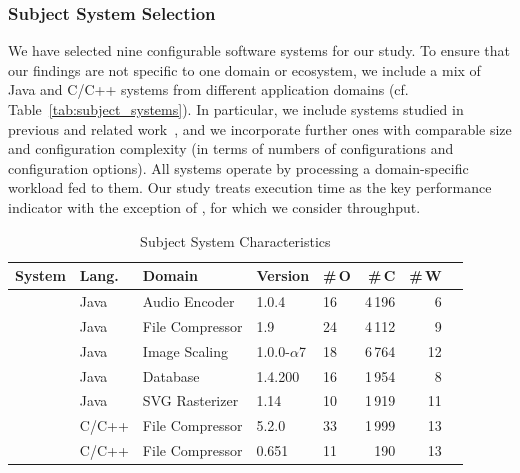 {\subsubsection{Subject System Selection}
{\color{black}
We have selected nine configurable software systems for our study. To ensure that our findings are not specific to one domain or ecosystem, we include a mix of Java and C/C++ systems from different application domains (cf. Table~\ref{tab:subject_systems}). In particular, we include systems studied in previous and related work~\cite{velez_2020_configcrusher_jase,weber_white_2021,alves_sampling_2020}, and we incorporate further ones with comparable size and configuration complexity (in terms of numbers of configurations and configuration options). All systems operate by processing a domain-specific workload fed to them. Our study treats execution time as the key performance indicator with the exception of \htwo, for which we consider throughput.

\begin{table}
	\footnotesize
	\centering
	\caption{Subject System Characteristics}
	

\begin{tabular}{p{1.1cm}p{0.6cm}p{1.9cm}p{0.99cm}p{0.2cm}rrr}
	\toprule
	\textbf{System} & \textbf{Lang.} & \textbf{Domain} & \textbf{Version} & \textbf{\#\,O} & \textbf{\#\,C} & \textbf{\#\,W}  \\
	
	
	\midrule
	\jumper & Java & Audio Encoder & 1.0.4 & 16 & 4\,196 & 6   \\
	
	\kanzi &Java  & File Compressor & 1.9 & 24 & 4\,112 & 9 \\
	
	\dconvert & Java & Image Scaling & 1.0.0-$\alpha$7 & 18 & 6\,764 & 12  \\
	
	\htwo & Java & Database & 1.4.200 & 16 & 1\,954  & 8  \\
	
	\batik & Java & SVG Rasterizer & 1.14 & 10 & 1\,919 &  11  \\

	\midrule
	
	\xz & C/C++ & File Compressor & 5.2.0 & 33 & 1\,999 & 13  \\
	\lrzip & C/C++ & File Compressor & 0.651 & 11 & 190 & 13  \\
	

\end{tabular}
\end{table}}}
